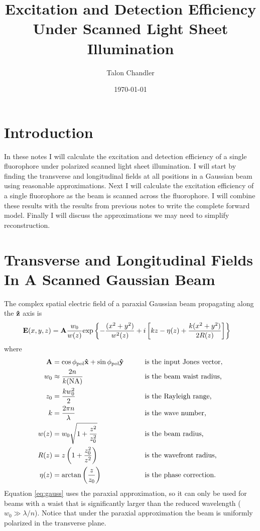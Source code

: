 \documentclass[11pt]{article}
\begin{document}
\title{\vspace{-2.5em} Excitation and Detection Efficiency Under Scanned Light
  Sheet Illumination \vspace{-2.5em}} \author{Talon Chandler}
\date{\vspace{-1em}\today\vspace{-1em}}
\maketitle
\section{Introduction}
In these notes I will calculate the excitation and detection efficiency of a
single fluorophore under polarized scanned light sheet illumination. I will
start by finding the transverse and longitudinal fields at all positions in a
Gaussian beam using reasonable approximations. Next I will calculate the
excitation efficiency of a single fluorophore as the beam is scanned across the
fluorophore. I will combine these results with the results from previous notes
to write the complete forward model. Finally I will discuss the approximations
we may need to simplify reconstruction.

\section{Transverse and Longitudinal Fields In A Scanned Gaussian Beam}
The complex spatial electric field of a paraxial Gaussian beam propagating along the
$\mathbf{\hat{z}}$ axis is \cite{nov}
\begin{align}
  \mathbf{E}(x,y,z) &= \mathbf{A}\frac{w_0}{w(z)}\text{exp}\left\{{-\frac{(x^2+y^2)}{w^2(z)}}+i\left[kz - \eta(z) + \frac{k(x^2+y^2)}{2R(z)}\right]\right\}\label{eq:gauss}
\end{align}
where
\begin{alignat}{2}  
  \mathbf{A} &= \cos\phi_{\text{pol}}\mathbf{\hat{x}} + \sin\phi_{\text{pol}}\mathbf{\hat{y}}\qquad &&\text{is the input Jones vector},\\
  w_0 &\approx \frac{2n}{k(\text{NA})}\qquad &&\text{is the beam waist radius,}\\
  z_0 &= \frac{kw_0^2}{2} &&\text{is the Rayleigh range,}\\
  k &= \frac{2\pi n}{\lambda}\qquad &&\text{is the wave number,}\\
  w(z) &= w_0\sqrt{1+\frac{z^2}{z_0^2}}\qquad &&\text{is the beam radius,}\\  
  R(z) &= z\left(1+\frac{z_0^2}{z^2}\right)\qquad &&\text{is the wavefront radius,}\\
  \eta(z) &= \text{arctan}\left(\frac{z}{z_0}\right)\qquad &&\text{is the phase correction.}
\end{alignat}
Equation \ref{eq:gauss} uses the paraxial approximation, so it can only be used
for beams with a waist that is significantly larger than the reduced wavelength
($w_0 \gg \lambda/n$). Notice that under the paraxial approximation the beam is uniformly polarized in the transverse plane.
\end{document}
